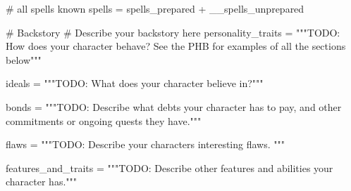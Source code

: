 # all spells known
spells = spells_prepared + __spells_unprepared

# Backstory
# Describe your backstory here
personality_traits = """TODO: How does your character behave? See the PHB for
examples of all the sections below"""

ideals = """TODO: What does your character believe in?"""

bonds = """TODO: Describe what debts your character has to pay,
and other commitments or ongoing quests they have."""

flaws = """TODO: Describe your characters interesting flaws.
"""

features_and_traits = """TODO: Describe other features and abilities your
character has."""


